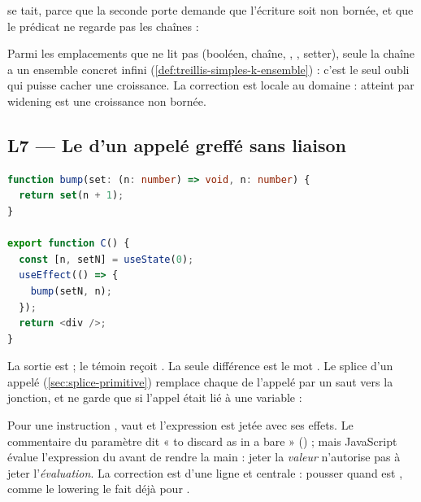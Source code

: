  se tait, parce que la seconde porte demande que l'écriture soit non bornée, et que le prédicat ne regarde pas les chaînes :


Parmi les emplacements que  ne lit pas (booléen, chaîne, , , setter), seule la chaîne a un ensemble concret infini (\cref{def:treillis-simples-k-ensemble}) : c'est le seul oubli qui puisse cacher une croissance. La correction est locale au domaine :  atteint par widening est une croissance non bornée.

\subsection{L7 --- Le \texorpdfstring{}{return} d'un appelé greffé sans liaison}

\begin{lstlisting}[language=TypeScript,caption={\file{/tmp/r27/ret/Ret.tsx} ; le témoin \file{/tmp/r27/ctrl/Ctrl.tsx} écrit \code{set(n + 1);} sans \code{return}}]
function bump(set: (n: number) => void, n: number) {
  return set(n + 1);
}

export function C() {
  const [n, setN] = useState(0);
  useEffect(() => {
    bump(setN, n);
  });
  return <div />;
}
\end{lstlisting}

La sortie est  ; le témoin reçoit . La seule différence est le mot . Le splice d'un appelé (\cref{sec:splice-primitive}) remplace chaque  de l'appelé par un saut vers la jonction, et ne garde  que si l'appel était lié à une variable :


Pour une instruction ,  vaut  et l'expression est jetée avec ses effets. Le commentaire du paramètre dit «  to discard as in a bare  » () ; mais JavaScript évalue l'expression du  avant de rendre la main : jeter la \emph{valeur} n'autorise pas à jeter l'\emph{évaluation}. La correction est d'une ligne et centrale : pousser  quand  est , comme le lowering le fait déjà pour .


